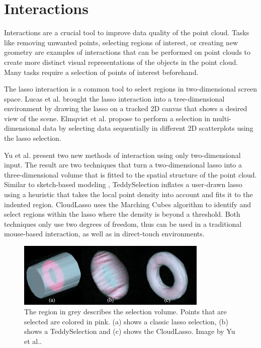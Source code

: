 \section {Interactions}
\label{sec:related_work_interactions}

Interactions are a crucial tool to improve data quality of the point cloud. Tasks like removing unwanted points, selecting regions of interest, or creating new geometry are examples of interactions that can be performed on point clouds to create more distinct visual representations of the objects in the point cloud. Many tasks require a selection of points of interest beforehand. 

\par

The lasso interaction is a common tool to select regions in two-dimensional screen space. Lucas et al. \cite{lucas2005design} brought the lasso interaction into a tree-dimensional environment by drawing the lasso on a tracked 2D canvas that shows a desired view of the scene. Elmqvist et al. \cite{elmqvist2008rolling} propose to perform a selection in multi-dimensional data by selecting data sequentially in different 2D scatterplots using the lasso selection. 

\par

Yu et al. \cite{yu2012efficient} present two new methods of interaction using only two-dimensional input. The result are two techniques that turn a two-dimensional lasso into a three-dimensional volume that is fitted to the spatial structure of the point cloud. Similar to sketch-based modeling \cite{igarashi2007teddy}, TeddySelection inflates a user-drawn lasso using a heuristic that takes the local point density into account and fits it to the indented region. CloudLasso uses the Marching Cubes algorithm \cite{lorensen1987marching} to identify and select regions within the lasso where the density is beyond a threshold. Both techniques only use two degrees of freedom, thus can be used in a traditional mouse-based interaction, as well as in direct-touch environments. 

\begin{figure}[ht]
    \centering
    \includegraphics[width=0.81\textwidth]{Related_Work/teddyCloudSelection.png}%
    \caption[Comparison of (a) simple lasso selection, (b) TeddySelection and (c) CloudLasso]
		{The region in grey describes the selection volume. Points that are selected are colored in pink. (a) shows a classic lasso selection, (b) shows a TeddySelection and (c) shows the CloudLasso. Image by Yu et al.\cite{yu2012efficient}.}
    \label{fig:teddyCloudSelection}
\end{figure}

